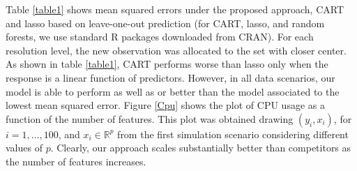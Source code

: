 \documentclass{article}
\newcommand{\Real}{\mathbb{R}}
\begin{document}
Table \ref{table1} shows mean squared errors under the proposed approach, CART and lasso based on leave-one-out prediction (for CART, lasso, and random forests, we use standard R packages downloaded from CRAN). For each resolution level, the new observation was allocated to the set with closer center. As shown in table \ref{table1}, CART performs worse than lasso only when the response is a linear function of predictors. However, in all data scenarios, our model is able to perform as well as or better than the model associated to the lowest mean squared error.  Figure \ref{Cpu} shows the plot of CPU usage as a function of the number of features. This plot was obtained drawing $(y_i, x_i)$, for $i=1, \ldots, 100$, and $x_i \in \Real^p$  from the first simulation scenario considering different values of $p$. Clearly, our approach scales substantially better than competitors as the number of features increases.
\end{document}
